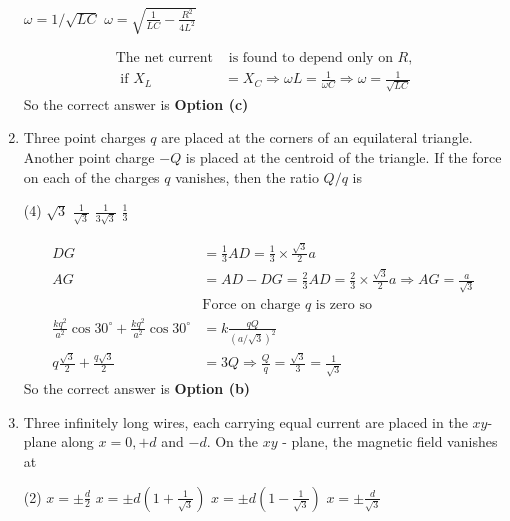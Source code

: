 \begin{enumerate}
\begin{tasks}
	\task[\textbf{c.}]$\omega=1 / \sqrt{L C}$
	\task[\textbf{d.}]$\omega=\sqrt{\frac{1}{L C}-\frac{R^{2}}{4 L^{2}}}$ 
\end{tasks}
\begin{answer}
	\begin{align*}
	\text{The net current}&\text{ is found to depend only on $R$,}\\
	\text { if } X_{L}&=X_{C} \Rightarrow \omega L=\frac{1}{\omega C} \Rightarrow \omega=\frac{1}{\sqrt{L C}}
	\end{align*}
		So the correct answer is \textbf{Option (c)}
\end{answer}
\item Three point charges $q$ are placed at the corners of an equilateral triangle. Another point charge $-Q$ is placed at the centroid of the triangle. If the force on each of the charges $q$ vanishes, then the ratio $Q / q$ is
 \begin{tasks}(4)
	\task[\textbf{a.}]$\sqrt{3}$
	\task[\textbf{b.}]$\frac{1}{\sqrt{3}}$
	\task[\textbf{c.}]$\frac{1}{3 \sqrt{3}}$
	\task[\textbf{d.}]$\frac{1}{3}$ 
\end{tasks}
\begin{answer}
	\begin{align*}
 D G&=\frac{1}{3} A D=\frac{1}{3} \times \frac{\sqrt{3}}{2} a\\
	A G&=A D-D G=\frac{2}{3} A D=\frac{2}{3} \times \frac{\sqrt{3}}{2} a \Rightarrow A G=\frac{a}{\sqrt{3}}\\
	&\text{Force on charge $q$ is zero so}\\
	\frac{k q^{2}}{a^{2}} \cos 30^{\circ}+\frac{k q^{2}}{a^{2}} \cos 30^{\circ}&=k \frac{q Q}{(a / \sqrt{3})^{2}} \\
	q \frac{\sqrt{3}}{2}+\frac{q \sqrt{3}}{2}&=3 Q \Rightarrow \frac{Q}{q}=\frac{\sqrt{3}}{3}=\frac{1}{\sqrt{3}}
	\end{align*}
		So the correct answer is \textbf{Option (b)}
\end{answer}
\item Three infinitely long wires, each carrying equal current are placed in the $x y$-plane along $x=0,+d$ and $-d$. On the $x y$ - plane, the magnetic field vanishes at
 \begin{tasks}(2)
	\task[\textbf{a.}]$x=\pm \frac{d}{2}$
	\task[\textbf{b.}]$x=\pm d\left(1+\frac{1}{\sqrt{3}}\right)$
	\task[\textbf{c.}] $x=\pm d\left(1-\frac{1}{\sqrt{3}}\right)$
	\task[\textbf{d.}] $x=\pm \frac{d}{\sqrt{3}}$
\end{tasks}	
\begin{answer}

\end{answer}
\end{enumerate}
